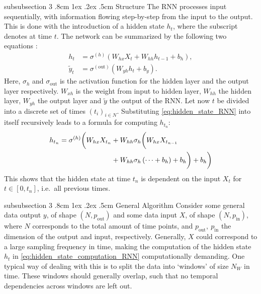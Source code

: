 \documentclass[%
reprint,
amsmath,amssymb,
aps,
]{revtex4-2}
\makeatletter
\renewcommand{\subsubsection}{%
	\@startsection
	{subsubsection}%
	{3}%
	{\z@}%
	{.8cm \@plus1ex \@minus .2ex}%
	{.5cm}%
	{\normalfont\small\centering}%
}
\makeatother
\begin{document}
\subsubsection{Structure}
The RNN processes input sequentially, with information flowing step-by-step from the input to the output. This is done with the introduction of a hidden state \(h_{t}\), where the subscript denotes at time \(t\). The network can be summarized by the following two equations \cite{tallec2017unbiasingtruncatedbackpropagationtime}:
\begin{subequations}
\begin{align}
	h_{t} &= \sigma^{(h)}\left(W_{hx}X_{t} + W_{hh}h_{t-1}  + b_{h}\right), \label{eq:hidden_state_RNN} \\
	\tilde{y}_{t} &= \sigma^{(\text{out})}\left(W_{yh}h_{t} + b_{y}\right).	\label{eq:output_RNN}
\end{align}
\end{subequations}
Here, \(\sigma_h\) and \(\sigma_{\text{out}}\) is the activation function for the hidden layer and the output layer respectively. \(W_{xh}\) is the weight from input to hidden layer, \(W_{hh}\) the hidden layer, \(W_{yh}\) the output layer and \(\tilde{y}\) the output of the RNN. Let now \(t\) be divided into a discrete set of times \((t_i)_{i\in N}\). Substituting \eqref{eq:hidden_state_RNN} into itself recursively leads to a formula for computing \(h_{t_n}\):
\begin{align}	\label{eq:hidden_state_computation_RNN}
	h_{t_n} = \sigma^{(h)}\biggl( W_{hx}X_{t_n} &+ W_{hh}\sigma_h \biggl( W_{hx}X_{t_{n-1}} \notag\\
	&+ W_{hh}\sigma_h \left(\dots + b_h\right) + b_h\biggr) 
	+b_h\biggr)
\end{align}
This shows that the hidden state at time \(t_n\) is dependent on the input \(X_{t}\) for \(t\in[0, t_n]\), i.e.~all previous times. 

\subsubsection{General Algorithm}
Consider some general data output \(y\), of shape \((N, p_{\text{out}})\) and some data input \(X\), of shape \((N, p_{\text{in}})\), where \(N\) corresponds to the total amount of time points, and \(p_{\text{out}}, \ p_{\text{in}}\) the dimension of the output and input, respectively. Generally, \(X\) could correspond to a large sampling frequency in time, making the computation of the hidden state \(h_t\) in \eqref{eq:hidden_state_computation_RNN} computationally demanding. One typical way of dealing with this is to split the data into `windows' of size \(N_{W}\) in time. These windows should generally overlap, such that no temporal dependencies across windows are left out. 
\end{document}
